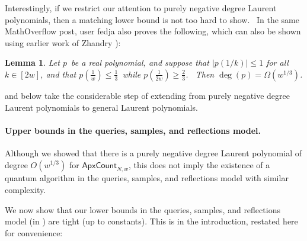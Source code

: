 \documentclass[10pt,a4paper]{article}
\newtheorem{lemma}[theorem]{Lemma}
\newcommand{\<}{\langle}
\renewcommand{\>}{\rangle}
\newcommand{\ApxCount}{\mathsf{ApxCount}_{N,w}}
\newcommand{\para}[1]{\paragraph{#1}}
\begin{document}
Interestingly, if we restrict our attention to purely negative degree
Laurent polynomials, then a matching lower bound is not too hard to show. \
In the same MathOverflow post, user fedja also proves the following, which can also
be shown using earlier work of Zhandry \cite[Proof of Theorem 7.3]{zhandry}):

\begin{lemma}
\label{fedjalem}Let $p$\ be a real polynomial, and suppose that $\left\vert
p\left( 1/k\right) \right\vert \leq1$ for all $k\in\left[ 2w\right] $, and
that $p\left( \frac{1}{w}\right) \leq\frac{1}{3}$\ while $p\left( \frac{1}{2w
}\right) \geq\frac{2}{3}$. \ Then $\deg\left( p\right) =\Omega\left(
w^{1/3}\right) $.
\end{lemma}

 and  below take the considerable step of
extending \Cref{fedjalem} from purely negative degree Laurent
polynomials to general Laurent polynomials.


\para{Upper bounds in the queries, samples, and reflections model.} 
Although we showed that there is a purely negative degree Laurent polynomial of degree
$O(w^{1/3})$ for $\ApxCount$, this does not imply the existence of a quantum algorithm
in the queries, samples, and reflections model with similar complexity.

We now show that our lower bounds in the queries, samples, and reflections model (in ) are tight (up to constants). This is  in the introduction, restated here for convenience:

\alg*
\end{document}
